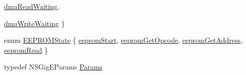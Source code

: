 \begin{DoxyCompactItemize}
\hyperlink{classNSGigE_a8adb9656d6ea50580adaf9c8e7d9eebfa527b92b8ddb1df081f186508a6be17b0}{dmaReadWaiting}, 
\par
\hyperlink{classNSGigE_a8adb9656d6ea50580adaf9c8e7d9eebfac402a406d9dcf7e02148a29616eb51a1}{dmaWriteWaiting}
 \}
\item 
enum \hyperlink{classNSGigE_ae796bda509051d219eda8ee36e00107f}{EEPROMState} \{ \hyperlink{classNSGigE_ae796bda509051d219eda8ee36e00107fad6aaccf5333d93ea0c4d9d33ff75aa53}{eepromStart}, 
\hyperlink{classNSGigE_ae796bda509051d219eda8ee36e00107fab9d47fa4ccfa9477d0d54e244bc10e9a}{eepromGetOpcode}, 
\hyperlink{classNSGigE_ae796bda509051d219eda8ee36e00107fa7ccb28e74093adb6c1a705ed31a79c58}{eepromGetAddress}, 
\hyperlink{classNSGigE_ae796bda509051d219eda8ee36e00107fa3d21338f7132a3722f554cbea7eaf7a6}{eepromRead}
 \}
\item 
typedef NSGigEParams \hyperlink{classNSGigE_a3d96e676dc626c146631b6fa53a9d823}{Params}
\end{DoxyCompactItemize}
